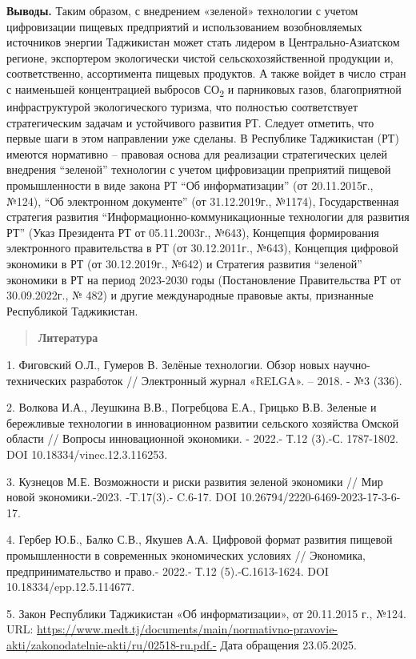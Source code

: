 {\bfseries Выводы.} Таким образом, с внедрением «зеленой» технологии с
учетом цифровизации пищевых предприятий и использованием возобновляемых
источников энергии Таджикистан может стать лидером в
Центрально-Азиатском регионе, экспортером экологически чистой
сельскохозяйственной продукции и, соответственно, ассортимента пищевых
продуктов. А также войдет в число стран с наименьшей концентрацией
выбросов СО\textsubscript{2} и парниковых газов, благоприятной
инфраструктурой экологического туризма, что полностью соответствует
стратегическим задачам и устойчивого развития РТ. Следует отметить, что
первые шаги в этом направлении уже сделаны. В Республике Таджикистан
(РТ) имеются нормативно -- правовая основа для реализации стратегических
целей внедрения ``зеленой'' технологии с учетом цифровизации преприятий
пищевой промышленности в виде закона РТ ``Об информатизации'' (от
20.11.2015г., №124), ``Об электронном документе'' (от 31.12.2019г.,
№1174), Государственная стратегия развития
``Информационно-коммуникационные технологии для развития РТ'' (Указ
Президента РТ от 05.11.2003г., №643), Концепция формирования
электронного правительства в РТ (от 30.12.2011г., №643), Концепция
цифровой экономики в РТ (от 30.12.2019г., №642) и Стратегия развития
``зеленой'' экономики в РТ на период 2023-2030 годы (Постановление
Правительства РТ от 30.09.2022г., № 482) и другие международные правовые
акты, признанные Республикой Таджикистан.

\begin{quote}
{\bfseries Литература}
\end{quote}

1. Фиговский О.Л., Гумеров В. Зелёные технологии. Обзор новых
научно-технических разработок // Электронный журнал «RELGA». -- 2018. -
№3 (336).

2. Волкова И.А., Леушкина В.В., Погребцова Е.А., Грицько В.В. Зеленые и
бережливые технологии в инновационном развитии сельского хозяйства
Омской области // Вопросы инновационной экономики. - 2022.- Т.12 (3).-С.
1787-1802. DOI 10.18334/vinec.12.3.116253.

3. Кузнецов М.Е. Возможности и риски развития зеленой экономики // Мир
новой экономики.-2023. -T.17(3).- C.6-17. DOI
10.26794/2220-6469-2023-17-3-6-17.

4. Гербер Ю.Б., Балко С.В., Якушев А.А. Цифровой формат развития пищевой
промышленности в современных экономических условиях // Экономика,
предпринимательство и право.- 2022.- Т.12 (5).-С.1613-1624. DOI
10.18334/epp.12.5.114677.

5. Закон Республики Таджикистан «Об информатизации», от 20.11.2015 г.,
№124. URL:
\url{https://www.medt.tj/documents/main/normativno-pravovie-akti/zakonodatelnie-akti/ru/02518-ru.pdf.-}
Дата обращения 23.05.2025.

